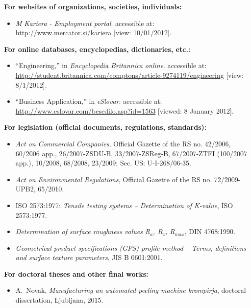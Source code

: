 \textbf{For websites of organizations, societies, individuals:}
\begin{itemize}
\item[{[13]}] \emph{M Kariera - Employment portal}. accessible at:
\url{http://www.mercator.si/kariera} [view: 10/01/2012].
\end{itemize}

\textbf{For online databases, encyclopedias, dictionaries, etc.:}
\begin{itemize}
\item[{[14]}] ``Engineering,'' in \emph{Encyclopedia Britannica online}.
accessible at:
\url{http://student.britannica.com/comptons/article-9274119/engineering}
[view: 8/1/2012].\\

\item[{[15]}] ``Business Application,'' in \emph{eSlovar}. accessible at:
\url{http://www.eslovar.com/besedilo.asp?id=1563} [viewed: 8 January 2012].
\end{itemize}

\textbf{For legislation (official documents, regulations, standards):}
\begin{itemize}
\item[{[16]}] \emph{Act on Commercial Companies}, Official Gazette of the RS no.
42/2006, 60/2006 app., 26/2007-ZSDU-B, 33/2007-ZSReg-B, 67/2007-ZTFI
(100/2007
app.), 10/2008, 68/2008, 23/2009; Sec. US: U-I-268/06-35.\\

\item[{[17]}] \emph{Act on Environmental Regulations}, Official Gazette of the RS no.
72/2009-UPB2, 65/2010.\\

\item[{[18]}] {ISO 2573:1977}: \emph{Tensile testing systems –
Determination of
K-value}, {ISO 2573:1977}.\\

\item[{[19]}] \emph{Determination of surface roughness values R$_a$, R$_z$,
R$_{max}$}, {DIN 4768:1990}.\\

\item[{[20]}] \emph{Geometrical product specifications (GPS) profile method
–
Terms, definitions and surface texture parameters}, {JIS B 0601:2001}.
\end{itemize}

\textbf{For doctoral theses and other final works:}
\begin{itemize}
\item[{[21]}] A.~Novak, \emph{Manufacturing an automated peeling machine
krompirja}, doctoral dissertation, Ljubljana, 2015.
\end{itemize}

